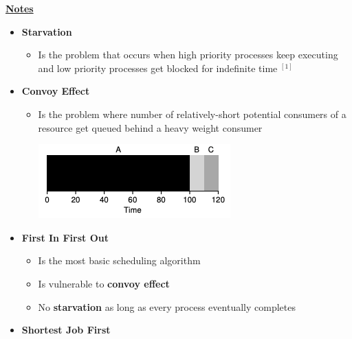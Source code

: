 \documentclass[12pt]{article}
\begin{document}
\begin{enumerate}[1.]
\begin{enumerate}[a)]
        \underline{\textbf{Notes}}

        \begin{itemize}
            \item \textbf{Starvation}

            \begin{itemize}
                \item Is the problem that occurs when high priority processes keep
                executing and low priority processes get blocked for indefinite time $^{[1]}$
            \end{itemize}

            \item \textbf{Convoy Effect}

            \begin{itemize}
                \item Is the problem where number of relatively-short potential consumers
                of a resource get queued behind a heavy weight consumer

                \bigskip

                \begin{center}
                \includegraphics[width=0.7\linewidth]{images/midterm_2_solution_5.png}
                \end{center}
            \end{itemize}

            \item \textbf{First In First Out}

            \begin{itemize}
                \item Is the most basic scheduling algorithm
                \item Is vulnerable to \textbf{convoy effect}
                \item No \textbf{starvation} as long as every process eventually completes
            \end{itemize}

            \item \textbf{Shortest Job First}


\end{itemize}
\end{enumerate}
\end{enumerate}
\end{document}
